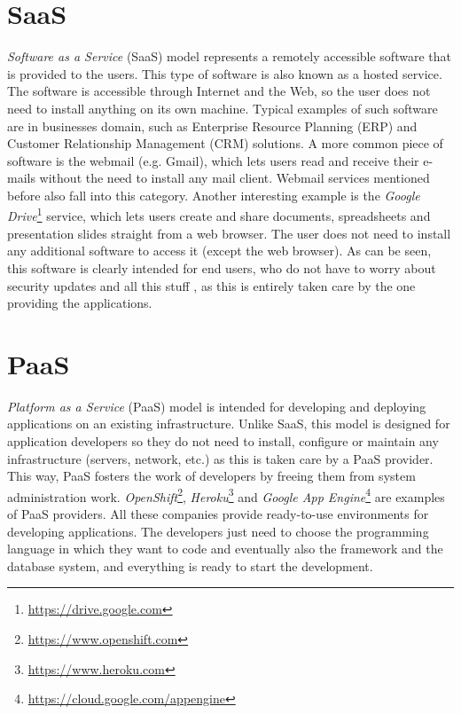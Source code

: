 \section{SaaS}
\textit{Software as a Service} (SaaS) model represents a remotely accessible software that is provided to the users. 
This type of software is also known as a hosted service. 
The software is accessible through Internet and the Web, so the user does not need to install anything on its own machine. 
Typical examples of such software are in businesses domain, such as Enterprise Resource Planning (ERP) and Customer Relationship Management (CRM) solutions. 
A more common piece of software is the webmail (e.g. Gmail), which lets users read and receive their e-mails without the need to install any mail client. 
Webmail services mentioned before also fall into this category. 
Another interesting example is the \textit{Google Drive}\footnote{\url{https://drive.google.com}} service, which lets users create and share documents, spreadsheets and presentation slides straight from a web browser. 
The user does not need to install any additional software to access it (except the web browser). 
As can be seen, this software is clearly intended for end users, who do not have to worry about security updates and all this stuff , as this is entirely taken care by the one providing the applications.



\section{PaaS}
 \textit{Platform as a Service} (PaaS) model is intended for developing and deploying applications on an existing infrastructure.
Unlike SaaS, this model is designed for application developers so they do not need to install, configure or maintain any infrastructure (servers, network, etc.) as this is taken care by a PaaS provider. 
This way, PaaS fosters the work of developers by freeing them from system administration work. 
\textit{OpenShift}\footnote{\url{https://www.openshift.com}}, \textit{Heroku}\footnote{\url{https://www.heroku.com}} and \textit{Google App Engine}\footnote{\url{https://cloud.google.com/appengine}} are examples of PaaS providers.
All these companies provide ready-to-use environments for developing applications.
The developers just need to choose the programming language in which they want to code and eventually also the framework and the database system, and everything is ready to start the development.



